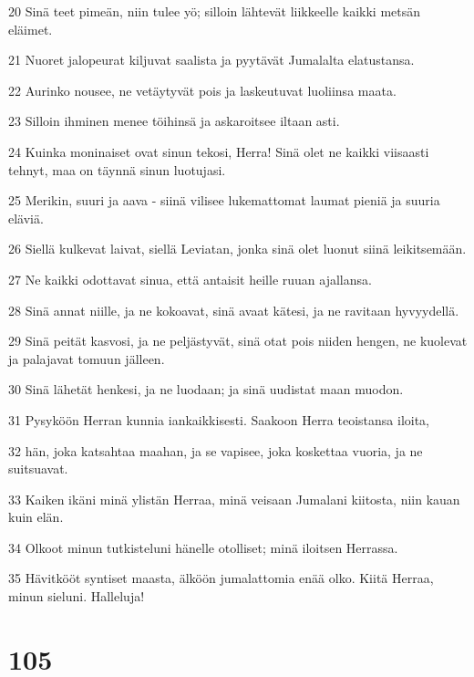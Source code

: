 \par 20 Sinä teet pimeän, niin tulee yö; silloin lähtevät liikkeelle kaikki metsän eläimet.
\par 21 Nuoret jalopeurat kiljuvat saalista ja pyytävät Jumalalta elatustansa.
\par 22 Aurinko nousee, ne vetäytyvät pois ja laskeutuvat luoliinsa maata.
\par 23 Silloin ihminen menee töihinsä ja askaroitsee iltaan asti.
\par 24 Kuinka moninaiset ovat sinun tekosi, Herra! Sinä olet ne kaikki viisaasti tehnyt, maa on täynnä sinun luotujasi.
\par 25 Merikin, suuri ja aava - siinä vilisee lukemattomat laumat pieniä ja suuria eläviä.
\par 26 Siellä kulkevat laivat, siellä Leviatan, jonka sinä olet luonut siinä leikitsemään.
\par 27 Ne kaikki odottavat sinua, että antaisit heille ruuan ajallansa.
\par 28 Sinä annat niille, ja ne kokoavat, sinä avaat kätesi, ja ne ravitaan hyvyydellä.
\par 29 Sinä peität kasvosi, ja ne peljästyvät, sinä otat pois niiden hengen, ne kuolevat ja palajavat tomuun jälleen.
\par 30 Sinä lähetät henkesi, ja ne luodaan; ja sinä uudistat maan muodon.
\par 31 Pysyköön Herran kunnia iankaikkisesti. Saakoon Herra teoistansa iloita,
\par 32 hän, joka katsahtaa maahan, ja se vapisee, joka koskettaa vuoria, ja ne suitsuavat.
\par 33 Kaiken ikäni minä ylistän Herraa, minä veisaan Jumalani kiitosta, niin kauan kuin elän.
\par 34 Olkoot minun tutkisteluni hänelle otolliset; minä iloitsen Herrassa.
\par 35 Hävitkööt syntiset maasta, älköön jumalattomia enää olko. Kiitä Herraa, minun sieluni. Halleluja!

\chapter{105}

